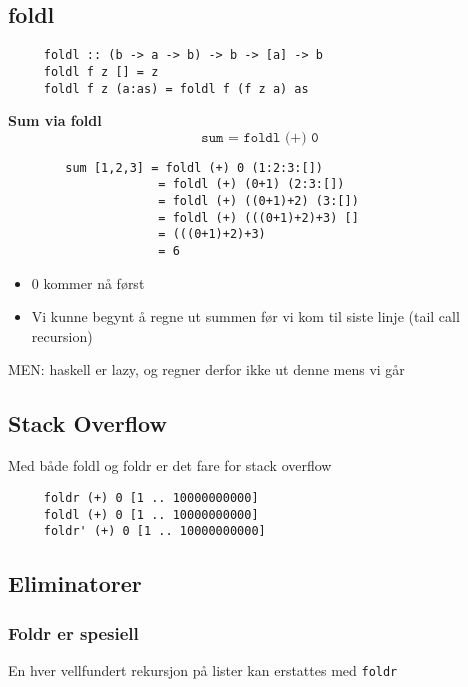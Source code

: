 \documentclass{article}
\begin{document}
     \subsection{foldl}
     \begin{lstlisting}
     foldl :: (b -> a -> b) -> b -> [a] -> b
     foldl f z [] = z
     foldl f z (a:as) = foldl f (f z a) as
     \end{lstlisting}

     \begin{eg}
         \textbf{Sum via foldl}
         \[ \texttt{sum = foldl (+) 0}\]

        \begin{lstlisting}
        sum [1,2,3] = foldl (+) 0 (1:2:3:[]) 
                     = foldl (+) (0+1) (2:3:[])
                     = foldl (+) ((0+1)+2) (3:[])
                     = foldl (+) (((0+1)+2)+3) []
                     = (((0+1)+2)+3)
                     = 6
        \end{lstlisting}
     \end{eg}

     \begin{itemize}
         \item 0 kommer nå først
         \item Vi kunne begynt å regne ut summen før vi kom til siste linje (tail call recursion)
     \end{itemize}

     MEN: haskell er lazy, og regner derfor ikke ut denne mens vi går

     \subsection{Stack Overflow}

     Med både foldl og foldr er det fare for stack overflow

     \begin{lstlisting}
     foldr (+) 0 [1 .. 10000000000]   
     foldl (+) 0 [1 .. 10000000000]   
     foldr' (+) 0 [1 .. 10000000000]   
     \end{lstlisting}

     \subsection{Eliminatorer}
     \subsubsection{Foldr er spesiell}
     En hver vellfundert rekursjon på lister kan erstattes med \texttt{foldr}
\end{document}
